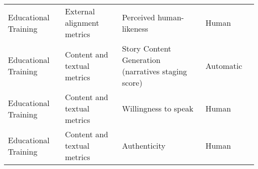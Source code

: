 \begin{small}
\begin{center}
\begin{longtable}{@{}p{}p{}p{}p{}p{}@{}}
Educational Training     & External alignment metrics          & Perceived human-likeness                                                                                                                                                                                    & Human     & \cite{Cheng2024LLMPoweredAT}                                                                                                                                                                                                                                                                                                                                                                                               \\
Educational Training     & Content and textual metrics         & Story Content Generation (narratives staging score)                                                                                                                                                         & Automatic & \cite{Yan2024SocialLS}                                                                                                                                                                                                                                                                                                                                                                                                     \\
Educational Training     & Content and textual metrics         & Willingness to speak                                                                                                                                                                                        & Human     & \cite{Shi2023CGMICG}                                                                                                                                                                                                                                                                                                                                                                                                   \\
Educational Training     & Content and textual metrics         & Authenticity                                                                                                                                                                                                & Human     & \cite{lee2023generative} \\

\end{longtable}
\end{center}
\end{small}
